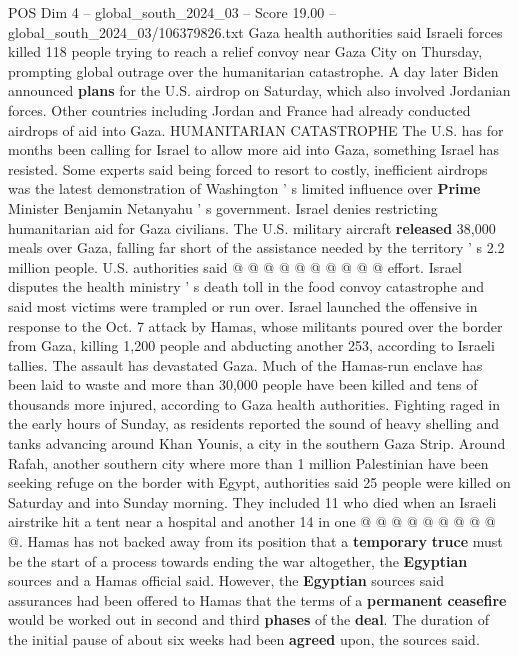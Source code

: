 \begin{textsample}{POS Dim 4 – global\_south\_2024\_03 – Score 19.00 – global\_south\_2024\_03/106379826.txt}
Gaza health authorities said Israeli forces killed 118 people trying to reach a relief convoy near Gaza City on Thursday, prompting global outrage over the humanitarian catastrophe.
A day later Biden announced \textbf{plans} for the U.S. airdrop on Saturday, which also involved Jordanian forces.
Other countries including Jordan and France had already conducted airdrops of aid into Gaza.
HUMANITARIAN CATASTROPHE The U.S. has for months been calling for Israel to allow more aid into Gaza, something Israel has resisted.
Some experts said being forced to resort to costly, inefficient airdrops was the latest demonstration of Washington ' s limited influence over \textbf{Prime} Minister Benjamin Netanyahu ' s government.
Israel denies restricting humanitarian aid for Gaza civilians.
The U.S. military aircraft \textbf{released} 38,000 meals over Gaza, falling far short of the assistance needed by the territory ' s 2.2 million people.
U.S. authorities said @ @ @ @ @ @ @ @ @ @ effort.
Israel disputes the health ministry ' s death toll in the food convoy catastrophe and said most victims were trampled or run over.
Israel launched the offensive in response to the Oct. 7 attack by Hamas, whose militants poured over the border from Gaza, killing 1,200 people and abducting another 253, according to Israeli tallies.
The assault has devastated Gaza.
Much of the Hamas-run enclave has been laid to waste and more than 30,000 people have been killed and tens of thousands more injured, according to Gaza health authorities.
Fighting raged in the early hours of Sunday, as residents reported the sound of heavy shelling and tanks advancing around Khan Younis, a city in the southern Gaza Strip.
Around Rafah, another southern city where more than 1 million Palestinian have been seeking refuge on the border with Egypt, authorities said 25 people were killed on Saturday and into Sunday morning.
They included 11 who died when an Israeli airstrike hit a tent near a hospital and another 14 in one @ @ @ @ @ @ @ @ @ @.
Hamas has not backed away from its position that a \textbf{temporary} \textbf{truce} must be the start of a process towards ending the war altogether, the \textbf{Egyptian} sources and a Hamas official said.
However, the \textbf{Egyptian} sources said assurances had been offered to Hamas that the terms of a \textbf{permanent} \textbf{ceasefire} would be worked out in second and third \textbf{phases} of the \textbf{deal}.
The duration of the initial pause of about six weeks had been \textbf{agreed} upon, the sources said.

\end{textsample}
